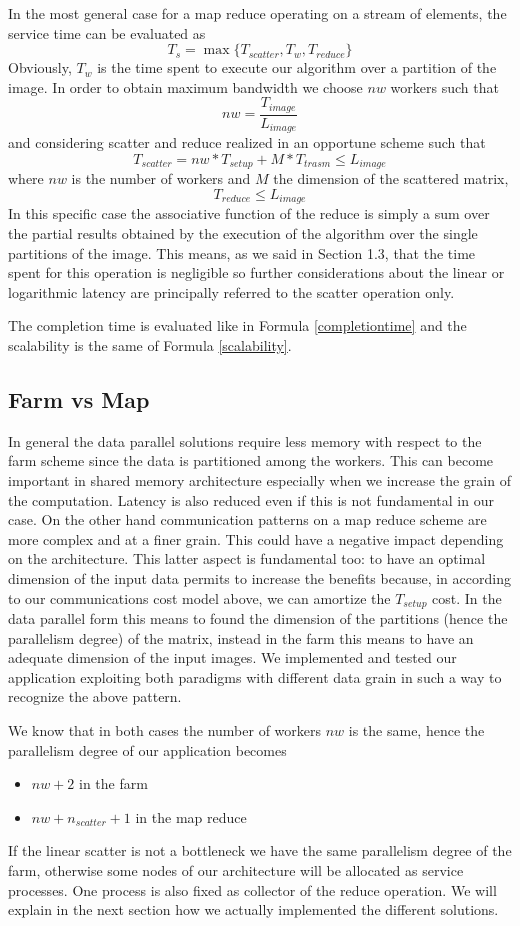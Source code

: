 In the most general case for a map reduce operating on a stream of elements, the service time can be evaluated as
\[
T_{s} = \max\lbrace T_{scatter}, T_{w}, T_{reduce}\rbrace
\] 
Obviously, $T_{w}$ is the time spent to execute our algorithm over a partition of the image. 
In order to obtain maximum bandwidth we choose $nw$ workers such that
\[
nw = \frac{T_{image}}{L_{image}}
\]
and considering scatter and reduce realized in an opportune scheme such that
\[
T_{scatter} = nw*T_{setup} + M*T_{trasm} \leq L_{image}
\]
where $nw$ is the number of workers and $M$ the dimension of the scattered matrix,
\[
T_{reduce} \leq L_{image}
\] 
In this specific case the associative function of the reduce is simply a sum over the partial results obtained by the execution of the algorithm over the single partitions of the image. 
This means, as we said in Section 1.3, that the time spent for this operation is negligible so further considerations about the linear or logarithmic latency are principally referred to the scatter operation only.

The completion time is evaluated like in Formula \ref{completiontime} and the scalability is the same of Formula \ref{scalability}.

\subsection{Farm vs Map}

In general the data parallel solutions require less memory with respect to the farm scheme since the data is partitioned among the workers. 
This can become important in shared memory architecture especially when we increase the grain of the computation.
Latency is also reduced even if this is not fundamental in our case.
On the other hand communication patterns on a map reduce scheme are more complex and at a finer grain. 
This could have a negative impact depending on the architecture.
This latter aspect is fundamental too: to have an optimal dimension of the input data permits to increase the benefits because, in according to our communications cost model above, we can amortize the $T_{setup}$ cost.
In the data parallel form this means to found the dimension of the partitions (hence the parallelism degree) of the matrix, instead in the farm this means to have an adequate dimension of the input images.
We implemented and tested our application exploiting both paradigms with different data grain in such a way to recognize the above pattern.

We know that in both cases the number of workers $nw$ is the same, hence the parallelism degree of our application becomes
\begin{itemize}
\item $nw+2$ in the farm
\item $nw+n_{scatter} + 1$ in the map reduce
\end{itemize}
If the linear scatter is not a bottleneck we have the same parallelism degree of the farm, otherwise some nodes of our architecture will be allocated as service processes.
One process is also fixed as collector of the reduce operation.
We will explain in the next section how we actually implemented the different solutions.